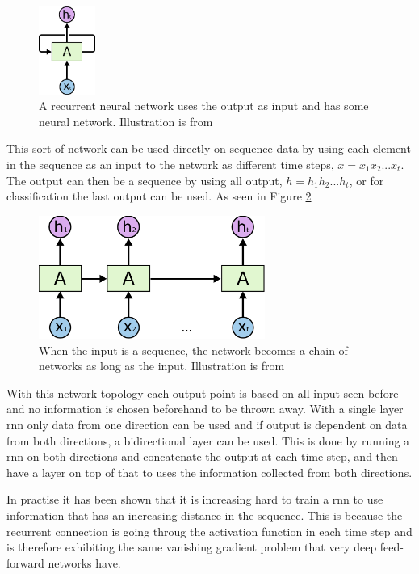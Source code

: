 \begin{figure}
	\centering
	\includegraphics[width=5em]{sections/theory/RNN-rolled.png}
	\caption{A recurrent neural network uses the output as input 
		and has some neural network. Illustration is from \cite{rnn}}
	\label{fig:rnn}
\end{figure}

This sort of network can be used directly on sequence data by using each element in the sequence as
an input to the network as different time steps, $x=x_1x_2...x_t$. The output can then be a sequence 
by using all output, $h=h_1h_2...h_t$, or for classification the last output can be used. 
As seen in Figure \ref{fig:rnn-seq}

\begin{figure}
	\centering
	\includegraphics[width=20em]{sections/theory/RNN-unrolled.png}
	\caption{When the input is a sequence, the network becomes a chain of networks 
		as long as the input. Illustration is from \cite{rnn}}
	\label{fig:rnn-seq}
\end{figure}

With this network topology each output point is based on all input seen before and no information is 
chosen beforehand to be thrown away. With a single layer \gls{rnn} only data from one direction can be used
and if output is dependent on data from both directions, a bidirectional layer can be used. This is 
done by running a \gls{rnn} on both directions and concatenate the output at each time step, 
and then have a layer on top of that to uses the information collected from both directions.

In practise it has been shown that it is increasing hard\cite{rnnLTD} to train a \gls{rnn} to 
use information that has an increasing distance in the sequence. This is because the recurrent connection 
is going throug the activation function in each time step and is therefore exhibiting the same vanishing 
gradient problem that very deep feed-forward networks have. 

